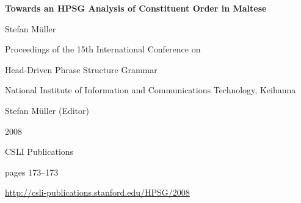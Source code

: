 \documentclass[a4paper,11pt]{article}
\begin{document}
\begin{center}
  {\huge\bf Towards an HPSG Analysis of Constituent Order in Maltese\par}

  \bigskip

  {\LARGE Stefan M\"{u}ller\par}

  \vspace*{3\bigskipamount}

  Proceedings of the 15th International Conference on\par Head-Driven Phrase Structure Grammar

  \bigskip

  National Institute of Information and Communications Technology, Keihanna

  \medskip

  Stefan Müller (Editor)

  \medskip

  2008

  \medskip

  CSLI Publications

  \medskip

  pages 173--173

  \medskip

  \url{http://csli-publications.stanford.edu/HPSG/2008}
\end{center}

\newpage

        
\end{document}
